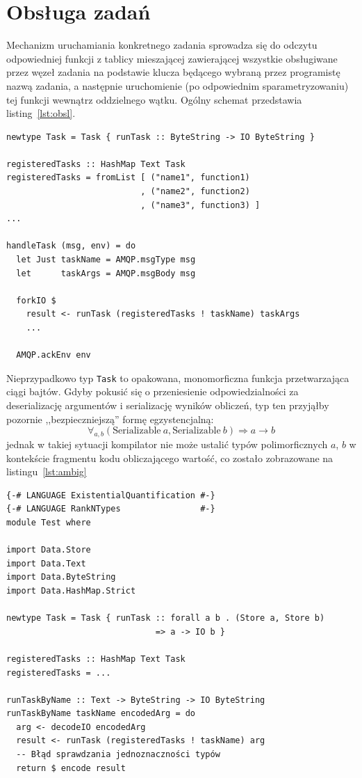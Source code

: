 \section{Obsługa zadań}
Mechanizm uruchamiania konkretnego zadania sprowadza się do odczytu odpowiedniej funkcji z tablicy mieszającej zawierającej wszystkie obsługiwane przez węzeł zadania na podstawie klucza będącego wybraną przez programistę nazwą zadania, a następnie uruchomienie (po odpowiednim sparametryzowaniu) tej funkcji wewnątrz oddzielnego wątku. Ogólny schemat przedstawia listing~\ref{lst:obsl}.

\begin{lstlisting}[caption=Schemat obsługi zadania, label=lst:obsl]
newtype Task = Task { runTask :: ByteString -> IO ByteString }

registeredTasks :: HashMap Text Task
registeredTasks = fromList [ ("name1", function1)
                           , ("name2", function2)
                           , ("name3", function3) ]
...

handleTask (msg, env) = do
  let Just taskName = AMQP.msgType msg
  let      taskArgs = AMQP.msgBody msg

  forkIO $
    result <- runTask (registeredTasks ! taskName) taskArgs
    ...
  
  AMQP.ackEnv env
\end{lstlisting}
Nieprzypadkowo typ \lstinline{Task} to opakowana, monomorficzna funkcja przetwarzająca ciągi bajtów. Gdyby pokusić się o przeniesienie odpowiedzialności za deserializację argumentów i serializację wyników obliczeń, typ ten przyjąłby pozornie ,,bezpieczniejszą'' formę egzystencjalną:
{\large $$\forall_{a, b} (\mathrm{Serializable}\ a, \mathrm{Serializable}\ b) \Rightarrow a \rightarrow b$$}%
jednak w takiej sytuacji kompilator nie może ustalić typów polimorficznych $a$, $b$ w kontekście fragmentu kodu obliczającego wartość, co zostało zobrazowane na listingu~\ref{lst:ambig}
\newpage
\begin{lstlisting}[caption=Problem typu zadania zdefiniowanego egzystencjalnie, label=lst:ambig]
{-# LANGUAGE ExistentialQuantification #-}
{-# LANGUAGE RankNTypes                #-}
module Test where

import Data.Store
import Data.Text
import Data.ByteString
import Data.HashMap.Strict

newtype Task = Task { runTask :: forall a b . (Store a, Store b) 
                              => a -> IO b }

registeredTasks :: HashMap Text Task
registeredTasks = ...

runTaskByName :: Text -> ByteString -> IO ByteString
runTaskByName taskName encodedArg = do
  arg <- decodeIO encodedArg
  result <- runTask (registeredTasks ! taskName) arg
  -- Błąd sprawdzania jednoznaczności typów
  return $ encode result
  
\end{lstlisting}

